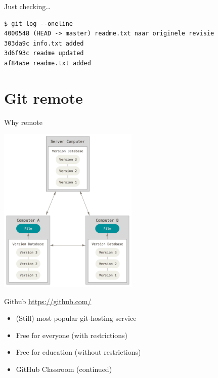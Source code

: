\documentclass[
  11pt,
  american,
  ignorenonframetext,
  aspectratio=43,
  compress,
  xcolor=dvipsnames]{beamer}
\providecommand{\tightlist}{%
  \setlength{\itemsep}{0pt}\setlength{\parskip}{0pt}}
\begin{document}
\begin{frame}[fragile]{Just checking\ldots{}}
\protect\hypertarget{just-checking}{}
\begin{verbatim}
$ git log --oneline
4000548 (HEAD -> master) readme.txt naar originele revisie
303da9c info.txt added
3d6f93c readme updated
af84a5e readme.txt added
\end{verbatim}
\end{frame}

\hypertarget{git-remote}{%
\section{Git remote}\label{git-remote}}

\begin{frame}{Why remote}
\protect\hypertarget{why-remote}{}
\begin{center}
\includegraphics[width=0.5\textwidth]{./images/distributed.png}
\end{center}
\end{frame}

\begin{frame}{Github}
\protect\hypertarget{github}{}
\url{https://github.com/}

\begin{itemize}
\tightlist
\item
  (Still) most popular git-hosting service
\item
  Free for everyone (with restrictions)
\item
  Free for education (without restrictions)
\item
  GitHub Classroom (continued)
\end{itemize}
\end{frame}
\end{document}
